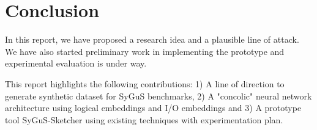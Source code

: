 
\section{Conclusion}

In this report, we have proposed a research idea and a plausible line of attack. We have also started preliminary work in implementing the prototype and experimental evaluation is under way. 

%
This report highlights the following contributions: 1) A line of direction to generate synthetic dataset for SyGuS benchmarks, 2) A "concolic" neural network architecture using logical embeddings and I/O embeddings and 3) A prototype tool SyGuS-Sketcher using existing techniques with experimentation plan.